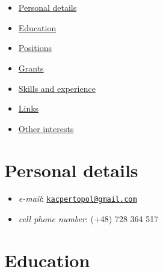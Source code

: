 \documentclass{article}
\providecommand{\tightlist}{%
  \setlength{\itemsep}{0pt}\setlength{\parskip}{0pt}}
\begin{document}
\hypertarget{section}{%
\section{}\label{section}}

\begin{itemize}
\tightlist
\item
  \protect\hyperlink{personal-details}{Personal details}
\item
  \protect\hyperlink{education}{Education}
\item
  \protect\hyperlink{positions}{Positions}
\item
  \protect\hyperlink{grants}{Grants}
\item
  \protect\hyperlink{skills-and-experience}{Skills and experience}
\item
  \protect\hyperlink{links}{Links}
\item
  \protect\hyperlink{other-interests}{Other interests}
\end{itemize}

\hypertarget{personal-details}{%
\section{Personal details}\label{personal-details}}

\begin{itemize}
\tightlist
\item
  \emph{e-mail}:
  \href{mailto:kacpertopol@gmail.com}{\nolinkurl{kacpertopol@gmail.com}}
\item
  \emph{cell phone number}: (+48) 728 364 517
\end{itemize}

\hypertarget{education}{%
\section{Education}\label{education}}
\end{document}
